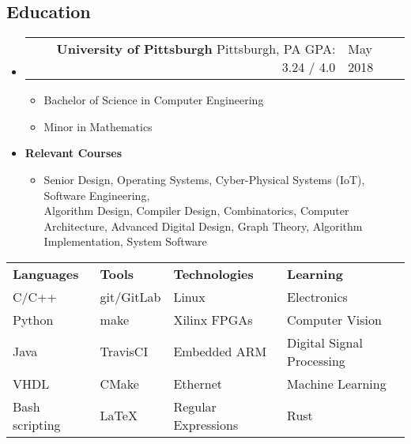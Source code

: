 \documentclass[18pt]{article}
\makeatletter
\providecommand{\tightlist}{
    \setlength{\itemsep}{0pt}\setlength{\parskip}{0pt}
}
\providecommand{\datetable}[2]{
    \begin{tabular*}{\textwidth}{@{}r @{\extracolsep{\fill}} l}
        #1 & #2
    \end{tabular*}
}
\makeatother
\begin{document}
    \subsection*{Education}\label{education}
    \begin{itemize}[label={}]

        \item \datetable{
            \textbf{University of Pittsburgh} \textbar{} Pittsburgh, PA \textbar{} GPA: 3.24 / 4.0
        }{May 2018}
        \begin{itemize}[ topsep=0pt]\tightlist
            \item Bachelor of Science in Computer Engineering
            \item Minor in Mathematics
        \end{itemize}
        \item \textbf{Relevant Courses}
        \begin{itemize}[label={}, topsep=0pt]
            \item
            Senior Design,
            Operating Systems,
            Cyber-Physical Systems (IoT),
            Software Engineering,\\
            Algorithm Design,
            Compiler Design,
            Combinatorics,
            Computer Architecture,
            Advanced Digital Design,
            Graph Theory,
            Algorithm Implementation,
            System Software
        \end{itemize}
    \end{itemize}

    \begin{center}\begin{tabular*}{0.85\textwidth}{ @{\extracolsep{\fill}} llll}
        \textbf{Languages} & \textbf{Tools} & \textbf{Technologies} & \textbf{Learning} \\
        C/C++              & git/GitLab     & Linux                 & Electronics \\
        Python             & make           & Xilinx FPGAs          & Computer Vision \\
        Java               & TravisCI       & Embedded ARM          & Digital Signal Processing \\
        VHDL               & CMake          & Ethernet              & Machine Learning \\
        Bash scripting     & \LaTeX         & Regular Expressions   & Rust
    \end{tabular*}\end{center}
\end{document}
